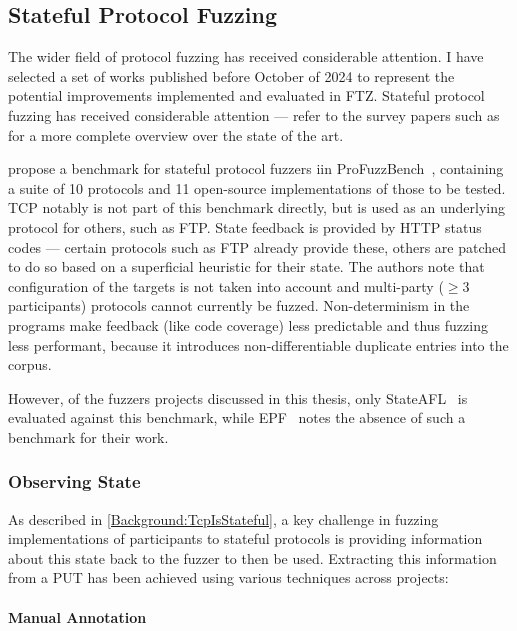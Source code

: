 \documentclass[twocolumn]{article}
\newcommand{\proj}{FTZ\xspace}
\let\savedCite=\cite
\renewcommand{\cite}{\unskip~\savedCite}
\begin{document}
\subsection{Stateful Protocol Fuzzing}

The wider field of protocol fuzzing has received considerable attention. I have selected a set of works published before October of 2024 to represent the potential improvements implemented and evaluated in \proj. Stateful protocol fuzzing has received considerable attention — refer to the survey papers such as \cite{StatefulReview,Survey,IndustrialReview} for a more complete overview over the state of the art.

\citeauthor{ProFuzzBench} propose a benchmark for stateful protocol fuzzers iin ProFuzzBench\cite{ProFuzzBench}, containing a suite of 10 protocols and 11 open-source implementations of those to be tested. TCP notably is not part of this benchmark directly, but is used as an underlying protocol for others, such as FTP. State feedback is provided by HTTP status codes — certain protocols such as FTP already provide these, others are patched to do so based on a superficial heuristic for their state. The authors note that configuration of the targets is not taken into account and multi-party ($\geq 3$ participants) protocols cannot currently be fuzzed. Non-determinism in the programs make feedback (like code coverage) less predictable and thus fuzzing less performant, because it introduces non-differentiable duplicate entries into the corpus.

However, of the fuzzers projects discussed in this thesis, only StateAFL\cite{StateAFL} is evaluated against this benchmark, while EPF\cite{EPF} notes the absence of such a benchmark for their work.

\subsubsection{Observing State}

As described in \cref{Background:TcpIsStateful}, a key challenge in fuzzing implementations of participants to stateful protocols is providing information about this state back to the fuzzer to then be used. Extracting this information from a PUT has been achieved using various techniques across projects:

\paragraph{Manual Annotation}
\end{document}
